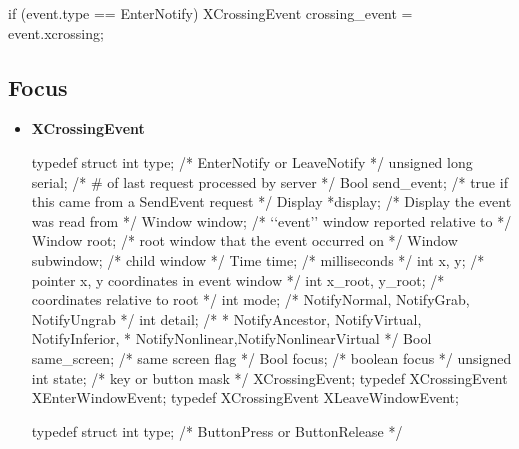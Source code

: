 \documentclass{report}
\begin{document}
\begin{itemize}
\begin{cppcode}
{                if (event.type == EnterNotify) {
                    XCrossingEvent crossing_event = event.xcrossing;
                }
            }
        \end{cppcode}

    \end{itemize}

    \pagebreak 
    \subsection{Focus}
    \begin{itemize}
        \item \textbf{XCrossingEvent}
            \bigbreak \noindent 
            \begin{cppcode}
                typedef struct {
                    int type;               /* EnterNotify or LeaveNotify */
                    unsigned long serial;   /* # of last request processed by server */
                    Bool send_event;        /* true if this came from a SendEvent request */
                    Display *display;       /* Display the event was read from */
                    Window window;          /* ‘‘event’’ window reported relative to */
                    Window root;            /* root window that the event occurred on */
                    Window subwindow;       /* child window */
                    Time time;              /* milliseconds */
                    int x, y;               /* pointer x, y coordinates in event window */
                    int x_root, y_root;     /* coordinates relative to root */
                    int mode;               /* NotifyNormal, NotifyGrab, NotifyUngrab */
                    int detail;
                                            /*
                                            * NotifyAncestor, NotifyVirtual, NotifyInferior,
                                            * NotifyNonlinear,NotifyNonlinearVirtual
                                            */
                    Bool same_screen;       /* same screen flag */
                    Bool focus;             /* boolean focus */
                    unsigned int state;     /* key or button mask */
                } XCrossingEvent;
                typedef XCrossingEvent XEnterWindowEvent;
                typedef XCrossingEvent XLeaveWindowEvent;
            \end{cppcode}
            \begin{cppcode}
                typedef struct {
                    int type;               /* ButtonPress or ButtonRelease */
}
\end{cppcode}
\end{itemize}
\end{document}
